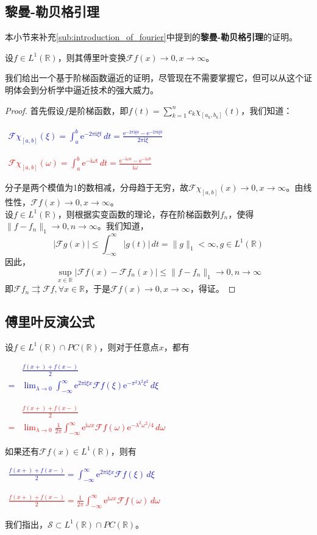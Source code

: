 \documentclass{ctexbook}
\newcommand{\lr}[2]{%
    \begin{center}
    \begin{minipage}[t]{0.45\textwidth}
        \centering
        \allowdisplaybreaks
        \textcolor{blue}{%
            \begin{varwidth}{\linewidth}
            $\begin{aligned}
            #1
            \end{aligned}$
            \end{varwidth}
        }
    \end{minipage}
    \hfill
    \begin{minipage}[t]{0.45\textwidth}
        \centering
        \allowdisplaybreaks
        \textcolor{red}{%
            \begin{varwidth}{\linewidth}
            $\begin{aligned}
            #2
            \end{aligned}$
            \end{varwidth}
        }
    \end{minipage}
\end{center}
}
\begin{document}
\subsection{黎曼-勒贝格引理}\label{sub:riemman_lebesgue_lemma}
本小节来补充\ref{sub:introduction_of_fourier}中提到的\textbf{黎曼-勒贝格引理}的证明。
\begin{theorem}[黎曼-勒贝格引理]
    设$f\in L^1(\mathbb{R})$，则其傅里叶变换$\mathcal{F} f(x)\to 0,x\to\infty$。
\end{theorem}
我们给出一个基于阶梯函数逼近的证明，尽管现在不需要掌握它，但可以从这个证明体会到分析学中逼近技术的强大威力。
\begin{proof}
    首先假设$f$是阶梯函数，即$f(t)=\sum_{k=1}^{n}c_k \chi_{[a_k,b_k]}(t)$，我们知道：\lr{
        \mathcal{F} \chi_{[a,b]}(\xi)=\int_{a}^{b}\mathrm{e}^{-2\pi \mathrm{i}\xi t}\,dt=\frac{\mathrm{e}^{-2\pi \mathrm{i}\xi a}-\mathrm{e}^{-2\pi \mathrm{i}\xi b}}{2\pi \mathrm{i}\xi}
    }{
        \mathcal{F} \chi_{[a,b]}(\omega)=\int_{a}^{b}\mathrm{e}^{-\mathrm{i}\omega t}\,dt=\frac{\mathrm{e}^{-\mathrm{i}\omega a}-\mathrm{e}^{-\mathrm{i}\omega b}}{\mathrm{i}\omega}
    }
    分子是两个模值为1的数相减，分母趋于无穷，故$\mathcal{F} \chi_{[a,b]}(x)\to 0,x\to\infty$。由线性性，$\mathcal{F} f(x)\to 0,x\to\infty$。\\
    设$f\in L^1(\mathbb{R})$，则根据实变函数的理论，存在阶梯函数列$f_n$，使得$\|f-f_n\|_1\to 0,n\to\infty$。我们知道，
    \[|\mathcal{F} g(x)|\leq \int_{-\infty}^{\infty}|g(t)|\,dt=\|g\|_1<\infty,g\in L^1(\mathbb{R})\]
    因此，
    \[\sup_{x\in\mathbb{R}}|\mathcal{F} f(x)-\mathcal{F} f_n(x)|\leq \|f-f_n\|_1\to 0,n\to\infty\]
    即$\mathcal{F} f_n\rightrightarrows\mathcal{F} f,\forall x\in\mathbb{R}$，于是$\mathcal{F} f(x)\to 0,x\to\infty$，得证。
\end{proof}

\subsection{傅里叶反演公式}\label{sub:fourier_inversion}
\begin{theorem}[傅里叶反演公式]
    设$f\in L^1(\mathbb{R})\cap PC(\mathbb{R})$，则对于任意点$x$，都有
    \lr{
        &\frac{f(x+)+f(x-)}{2}\\
        =&\lim_{\lambda\to 0}\int_{-\infty}^{\infty}\mathrm{e}^{2\pi \mathrm{i}\xi x}\mathcal{F} f(\xi)\mathrm{e}^{-\pi^2 \lambda^2 \xi^2}\,d\xi
    }{
        &\frac{f(x+)+f(x-)}{2}\\
        =&\lim_{\lambda\to 0}\frac{1}{2\pi}\int_{-\infty}^{\infty}\mathrm{e}^{\mathrm{i}\omega x}\mathcal{F} f(\omega)\mathrm{e}^{-\lambda^2\omega^2/4}\,d\omega
    }
    如果还有$\mathcal{F} f(x)\in L^1(\mathbb{R})$，则有
    \lr{
        \frac{f(x+)+f(x-)}{2}=\int_{-\infty}^{\infty}\mathrm{e}^{2\pi \mathrm{i}\xi x}\mathcal{F} f(\xi)\,d\xi
    }{
        \frac{f(x+)+f(x-)}{2}=\frac{1}{2\pi}\int_{-\infty}^{\infty}\mathrm{e}^{\mathrm{i}\omega x}\mathcal{F} f(\omega)\,d\omega
    }
\end{theorem}
我们指出，$\mathcal{S} \subset L^1(\mathbb{R})\cap PC(\mathbb{R})$。
\end{document}
